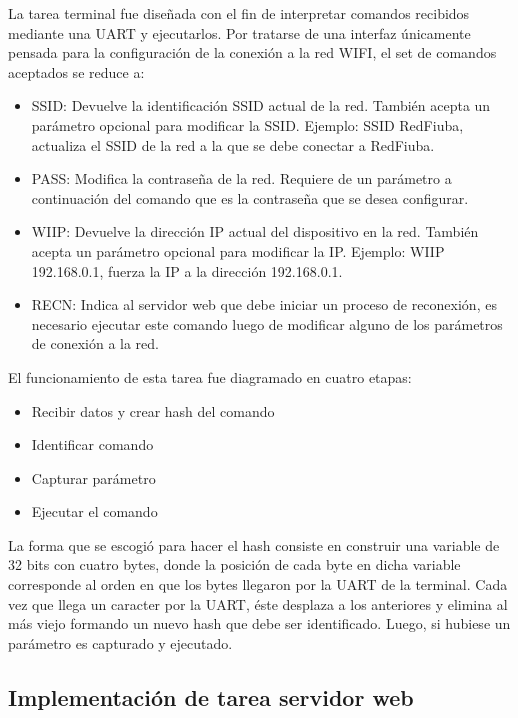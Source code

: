La tarea terminal fue diseñada con el fin de interpretar comandos recibidos mediante una UART y ejecutarlos. Por tratarse de una interfaz únicamente pensada para la configuración de la conexión a la red WIFI, el set de comandos aceptados se reduce a:
\begin{itemize}
	\item SSID: Devuelve la identificación SSID actual de la red. También acepta un parámetro opcional para modificar la SSID. Ejemplo: SSID RedFiuba, actualiza el SSID de la red a la que se debe conectar a RedFiuba.
	\item PASS: Modifica la contraseña de la red. Requiere de un parámetro a continuación del comando que es la contraseña que se desea configurar.
	\item WIIP: Devuelve la dirección IP actual del dispositivo en la red. También acepta un parámetro opcional para modificar la IP. Ejemplo: WIIP 192.168.0.1, fuerza la IP a la dirección 192.168.0.1.
	\item RECN: Indica al servidor web que debe iniciar un proceso de reconexión, es necesario ejecutar este comando luego de modificar alguno de los parámetros de conexión a la red.
\end{itemize}	

El funcionamiento de esta tarea fue diagramado en cuatro etapas:
\begin{itemize}
	\item Recibir datos y crear hash del comando
	\item Identificar comando
	\item Capturar parámetro
	\item Ejecutar el comando
\end{itemize}	

La forma que se escogió para hacer el hash consiste en construir una variable de 32 bits con cuatro bytes, donde la posición de cada byte en dicha variable corresponde al orden en que los bytes llegaron por la UART de la terminal. Cada vez que llega un caracter por la UART, éste desplaza a los anteriores y elimina al más viejo formando un nuevo hash que debe ser identificado. Luego, si hubiese un parámetro es capturado y ejecutado.


\subsection{Implementación de tarea servidor web}
\label{sec:Servidor}

